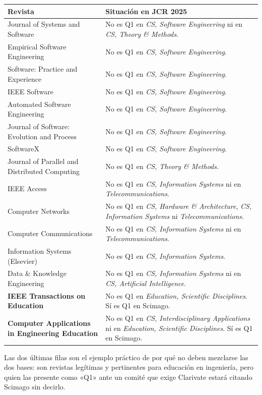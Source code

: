 \documentclass[11pt,a4paper]{article}
\begin{document}
\begin{center}
	\small
	\begin{tabular}{@{}p{7.4cm}p{7.6cm}@{}}
		\toprule
		\textbf{Revista} & \textbf{Situación en JCR 2025} \\
		\midrule
		Journal of Systems and Software & No es Q1 en \emph{CS, Software Engineering} ni en \emph{CS, Theory \& Methods}. \\
		Empirical Software Engineering & No es Q1 en \emph{CS, Software Engineering}. \\
		Software: Practice and Experience & No es Q1 en \emph{CS, Software Engineering}. \\
		IEEE Software & No es Q1 en \emph{CS, Software Engineering}. \\
		Automated Software Engineering & No es Q1 en \emph{CS, Software Engineering}. \\
		Journal of Software: Evolution and Process & No es Q1 en \emph{CS, Software Engineering}. \\
		SoftwareX & No es Q1 en \emph{CS, Software Engineering}. \\
		Journal of Parallel and Distributed Computing & No es Q1 en \emph{CS, Theory \& Methods}. \\
		IEEE Access & No es Q1 en \emph{CS, Information Systems} ni en \emph{Telecommunications}. \\
		Computer Networks & No es Q1 en \emph{CS, Hardware \& Architecture}, \emph{CS, Information Systems} ni \emph{Telecommunications}. \\
		Computer Communications & No es Q1 en \emph{CS, Information Systems} ni en \emph{Telecommunications}. \\
		Information Systems (Elsevier) & No es Q1 en \emph{CS, Information Systems}. \\
		Data \& Knowledge Engineering & No es Q1 en \emph{CS, Information Systems} ni en \emph{CS, Artificial Intelligence}. \\
		\textbf{IEEE Transactions on Education} & No es Q1 en \emph{Education, Scientific Disciplines}. Sí es Q1 en Scimago. \\
		\textbf{Computer Applications in Engineering Education} & No es Q1 en \emph{CS, Interdisciplinary Applications} ni en \emph{Education, Scientific Disciplines}. Sí es Q1 en Scimago. \\
		\bottomrule
	\end{tabular}
\end{center}

Las dos últimas filas son el ejemplo práctico de por qué no deben mezclarse las dos bases: son revistas legítimas y pertinentes para educación en ingeniería, pero quien las presente como «Q1» ante un comité que exige Clarivate estará citando Scimago sin decirlo.
\end{document}
